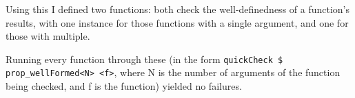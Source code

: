 \documentclass[11pt]{article}
\begin{document}

Using this I defined two functions: both check the well-definedness of a function's results, with one instance for those functions with a single argument, and one for those with multiple.


Running every function through these (in the form \verb|quickCheck $ prop_wellFormed<N> <f>|, where N is the number of arguments of the function being checked, and f is the function) yielded no failures.
\end{document}
